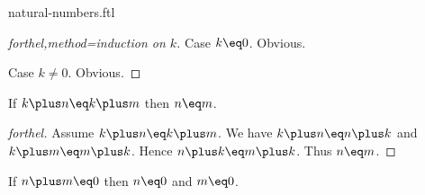 \documentclass{naproche-library}
\begin{document}
\begin{smodule}{natural-numbers.ftl}
\begin{proof}[forthel,method=induction on $k$]
    Case $k\eq0$. Obvious.

    Case $k\neq0$. Obvious.
  \end{proof}

  \begin{corollary}[forthel,title=Left cancellation,id=PlusIsLeftCancellativeProp]
    If $k\plus n\eq k\plus m$ then $n\eq m$.
  \end{corollary}
  \begin{proof}[forthel]
    Assume $k\plus n\eq k\plus m$.
    We have $k\plus n\eq n\plus k$ and $k\plus m\eq m\plus k$.
    Hence $n\plus k\eq m\plus k$.
    Thus $n\eq m$.
  \end{proof}

  \begin{proposition}[forthel,id=ZeroSumImpliesZeroSummandsProp]
    If $n\plus m\eq0$ then $n\eq0$ and $m\eq0$.
  \end{proposition}
\end{smodule}
\end{document}
